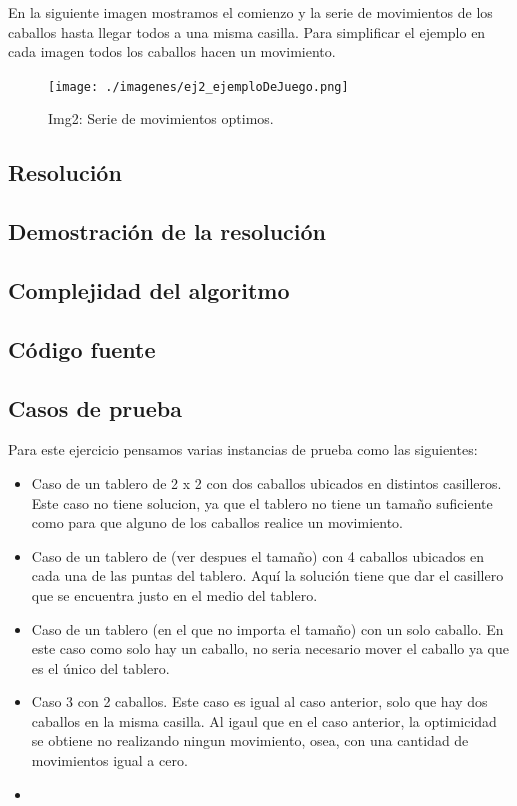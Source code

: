 En la siguiente imagen mostramos el comienzo y la serie de movimientos de los caballos hasta llegar todos a una misma casilla. Para simplificar el ejemplo en cada imagen todos los caballos hacen un movimiento.

\begin{figure}[H]
\begin{center}
\texttt{[image: ./imagenes/ej2\_ejemploDeJuego.png]}
\caption{Img2: Serie de movimientos optimos.}
\end{center}
\end{figure}


\subsection{Resoluci\'on}



\subsection{Demostraci\'on de la resoluci\'on}


\subsection{Complejidad del algoritmo}


\subsection{C\'odigo fuente}


\subsection{Casos de prueba}

Para este ejercicio pensamos varias instancias de prueba como las siguientes:

\begin{itemize}
\item Caso de un tablero de 2 x 2 con dos caballos ubicados en distintos casilleros. Este caso no tiene solucion, ya que el tablero no tiene un tamaño suficiente como para que alguno de los caballos realice un movimiento.
\item Caso de un tablero de (ver despues el tamaño) con 4 caballos ubicados en cada una de las puntas del tablero. Aquí la solución tiene que dar el casillero que se encuentra justo en el medio del tablero.
\item Caso de un tablero (en el que no importa el tamaño) con un solo caballo. En este caso como solo hay un caballo, no seria necesario mover el caballo ya que es el único del tablero.
\item Caso 3 con 2 caballos. Este caso es igual al caso anterior, solo que hay dos caballos en la misma casilla. Al igaul que en el caso anterior, la optimicidad se obtiene no realizando ningun movimiento, osea, con una cantidad de movimientos igual a cero.
\item
\end{itemize}

